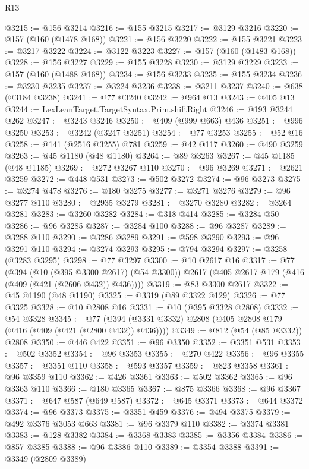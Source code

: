 \begin{lexlean}{R13}
\begin{coremodule}
{{{{{{{{{{{{{{{{{{{{{{{{{{{{{{{{{{{{{{{{{{{{{{{{{{{{{{{{{{{{{{{{{{{{{{{{{{{{{{{{{{{{{{{{{{{{{{{{{{{{{{{{{{@3215 := @156 @3214
@3216 := @155 @3215
@3217 := @3129 @3216
@3220 := @157 (@160 (@1478 @168))
@3221 := @156 @3220
@3222 := @155 @3221
@3223 := @3217 @3222
@3224 := @3122 @3223
@3227 := @157 (@160 (@1483 @168))
@3228 := @156 @3227
@3229 := @155 @3228
@3230 := @3129 @3229
@3233 := @157 (@160 (@1488 @168))
@3234 := @156 @3233
@3235 := @155 @3234
@3236 := @3230 @3235
@3237 := @3224 @3236
@3238 := @3211 @3237
@3240 := @638 (@3184 @3238)
@3241 := @77 @3240
@3242 := @964 @13
@3243 := @405 @13
@3244 := LexLeanTarget.TargetSyntax.Prim.shiftRight
@3246 := @193 @3244 @262
@3247 := @3243 @3246
@3250 := @409 (@999 @663) @436
@3251 := @996 @3250
@3253 := @3242 (@3247 @3251)
@3254 := @77 @3253
@3255 := @52 @16
@3258 := @141 (@2516 @3255) @781
@3259 := @42 @117
@3260 := @490 @3259
@3263 := @45 @1180 (@48 @1180)
@3264 := @89 @3263
@3267 := @45 @1185 (@48 @1185)
@3269 := @272 @3267 @110
@3270 := @96 @3269
@3271 := @2621 @3259
@3272 := @448 @531
@3273 := @502 @3272
@3274 := @96 @3273
@3275 := @3274 @478
@3276 := @180 @3275
@3277 := @3271 @3276
@3279 := @96 @3277 @110
@3280 := @2935 @3279
@3281 := @3270 @3280
@3282 := @3264 @3281
@3283 := @3260 @3282
@3284 := @318 @414
@3285 := @3284 @50
@3286 := @96 @3285
@3287 := @3284 @100
@3288 := @96 @3287
@3289 := @3288 @110
@3290 := @3286 @3289
@3291 := @598 @3290
@3293 := @96 @3291 @110
@3294 := @3274 @3293
@3295 := @794 @3294
@3297 := @3258 (@3283 @3295)
@3298 := @77 @3297
@3300 := @10 @2617 @16
@3317 := @77
    (@394
      (@10 (@395 @3300 @2617) (@54 @3300))
      @2617
      (@405 @2617 @179 (@416 (@409 (@421 (@2606 @432)) @436))))
@3319 := @83 @3300 @2617
@3322 := @45 @1190 (@48 @1190)
@3325 := @3319 (@89 @3322 @129)
@3326 := @77 @3325
@3328 := @10 @2808 @16
@3331 := @10 (@395 @3328 @2808)
@3332 := @54 @3328
@3345 := @77 (@394 (@3331 @3332) @2808 (@405 @2808 @179 (@416 (@409 (@421 (@2800 @432)) @436))))
@3349 := @812 (@54 (@85 @3332)) @2808
@3350 := @446 @422
@3351 := @96 @3350
@3352 := @3351 @531
@3353 := @502 @3352
@3354 := @96 @3353
@3355 := @270 @422
@3356 := @96 @3355
@3357 := @3351 @110
@3358 := @593 @3357
@3359 := @823 @3358
@3361 := @96 @3359 @110
@3362 := @426 @3361
@3363 := @502 @3362
@3365 := @96 @3363 @110
@3366 := @180 @3365
@3367 := @875 @3366
@3368 := @96 @3367
@3371 := @647 @587 (@649 @587)
@3372 := @645 @3371
@3373 := @644 @3372
@3374 := @96 @3373
@3375 := @3351 @459
@3376 := @494 @3375
@3379 := @492 @3376 @3053 @663
@3381 := @96 @3379 @110
@3382 := @3374 @3381
@3383 := @128 @3382
@3384 := @3368 @3383
@3385 := @3356 @3384
@3386 := @857 @3385
@3388 := @96 @3386 @110
@3389 := @3354 @3388
@3391 := @3349 (@2809 @3389)
}}}}}}}}}}}}}}}}}}}}}}}}}}}}}}}}}}}}}}}}}}}}}}}}}}}}}}}}}}}}}}}}}}}}}}}}}}}}}}}}}}}}}}}}}}}}}}}}}}}}}}}}}}
\end{coremodule}
\end{lexlean}
